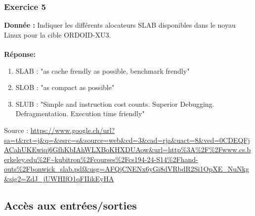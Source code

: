 \subsubsection{Exercice 5}
\noindent
\textbf{Donnée : }Indiquer les différents alocateurs SLAB disponibles dans le noyau Linux pour la cible ORDOID-XU3.\\\\
\textbf{Réponse:}
\begin{enumerate}
	\item SLAB : "as cache frendly as possible, benchmark frendly"
	\item SLOB : "as compact as possible"
	\item SLUB : "Simple and instruction cost counts. Superior Debugging. Defragmentation. Execution time friendly"
\end{enumerate}
Source : \url{https://www.google.ch/url?sa=t&rct=j&q=&esrc=s&source=web&cd=3&cad=rja&uact=8&ved=0CDEQFjACahUKEwiqj6GfhKbIAhWLXBoKHXDUAow&url=http%3A%2F%2Fwww.cs.berkeley.edu%2F~kubitron%2Fcourses%2Fcs194-24-S14%2Fhand-outs%2Fbonwick_slab.pdf&usg=AFQjCNENx6yGi8dVRbdR2Si1OpXE_NuNkg&sig2=ZdJ_jUWHIfO1qFIIikEyHA}
	
\subsection{Accès aux entrées/sorties}
